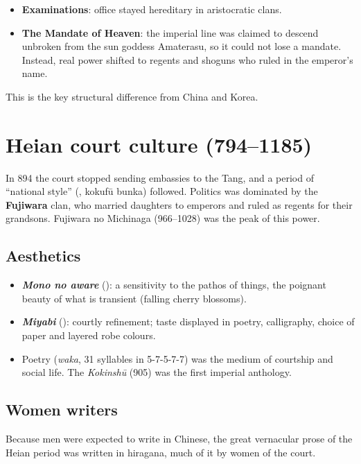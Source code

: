 \begin{important}
\begin{itemize}
  \item \textbf{Examinations}: office stayed hereditary in aristocratic clans.
  \item \textbf{The Mandate of Heaven}: the imperial line was claimed to descend unbroken
        from the sun goddess Amaterasu, so it could not lose a mandate. Instead, real
        power shifted to regents and shoguns who ruled in the emperor's name.
\end{itemize}
This is the key structural difference from China and Korea.
\end{important}

\section{Heian court culture (794--1185)}

In 894 the court stopped sending embassies to the Tang, and a period of ``national
style'' (, kokufū bunka) followed. Politics was dominated by the
\textbf{Fujiwara} clan, who married daughters to emperors and ruled as regents for their
grandsons. Fujiwara no Michinaga (966--1028) was the peak of this power.

\subsection{Aesthetics}

\begin{itemize}
  \item \textbf{\emph{Mono no aware}} (): a sensitivity to the pathos of
        things, the poignant beauty of what is transient (falling cherry blossoms).
  \item \textbf{\emph{Miyabi}} (): courtly refinement; taste displayed in poetry,
        calligraphy, choice of paper and layered robe colours.
  \item Poetry (\emph{waka}, 31 syllables in 5-7-5-7-7) was the medium of courtship and
        social life. The \emph{Kokinshū} (905) was the first imperial anthology.
\end{itemize}

\subsection{Women writers}

Because men were expected to write in Chinese, the great vernacular prose of the Heian
period was written in hiragana, much of it by women of the court.

